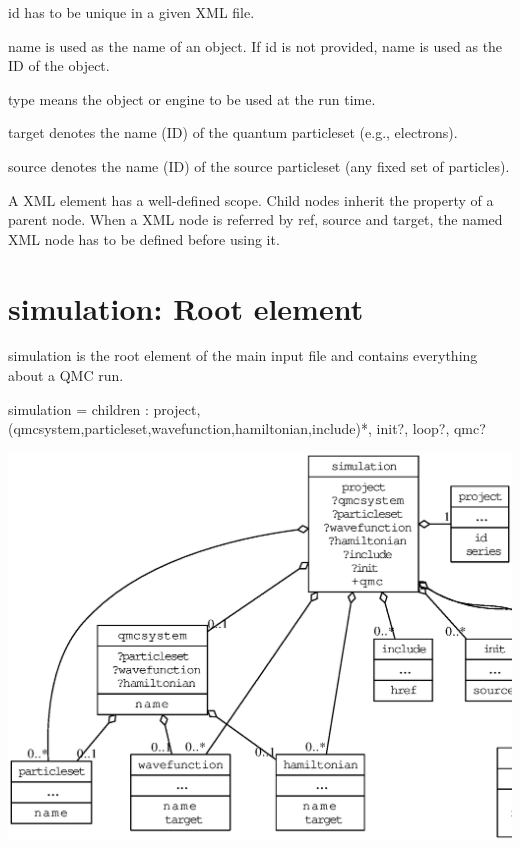 \begin{DoxyItemize}
\item {\ttfamily id} has to be unique in a given X\-M\-L file.
\item {\ttfamily name} is used as the name of an object. If {\ttfamily id} is not provided, {\ttfamily name} is used as the I\-D of the object.
\item {\ttfamily type} means the object or engine to be used at the run time.
\item {\ttfamily target} denotes the name (I\-D) of the quantum {\ttfamily particleset} (e.\-g., electrons).
\item {\ttfamily source} denotes the name (I\-D) of the source {\ttfamily particleset} (any fixed set of particles).
\end{DoxyItemize}

A X\-M\-L element has a well-\/defined scope. Child nodes inherit the property of a parent node. When a X\-M\-L node is referred by {\ttfamily ref}, {\ttfamily source} and {\ttfamily target}, the named X\-M\-L node has to be defined before using it.\section{simulation\-: Root element}\label{a00004_simX-ele}
{\ttfamily simulation} is the root element of the main input file and contains everything about a Q\-M\-C run. 
\begin{DoxyCode}
simulation = 
  children : project,
             (qmcsystem,particleset,wavefunction,hamiltonian,include)*,
             init?,
             loop?,
             qmc?
\end{DoxyCode}



\begin{DoxyImage}
\includegraphics[width=\textwidth,height=\textheight/2,keepaspectratio=true]{dot_simulation}
\caption{simulation element}
\end{DoxyImage}
